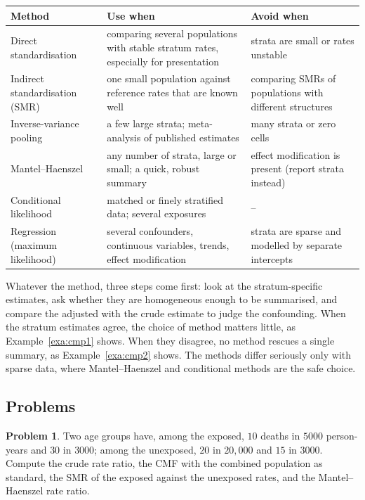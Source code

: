 \documentclass[11pt,a4paper]{article}
\numberwithin{equation}{section}
\theoremstyle{definition}
\newtheorem{problemx}{Problem}[subsection]
\newenvironment{problem}{\begin{problemx}}{\end{problemx}}
\begin{document}
\begin{center}
\begin{tabular}{p{3.6cm}p{5.4cm}p{5.4cm}}
\hline
Method & Use when & Avoid when \\
\hline
Direct standardisation & comparing several populations with stable stratum rates, especially for presentation & strata are small or rates unstable \\
Indirect standardisation (SMR) & one small population against reference rates that are known well & comparing SMRs of populations with different structures \\
Inverse-variance pooling & a few large strata; meta-analysis of published estimates & many strata or zero cells \\
Mantel--Haenszel & any number of strata, large or small; a quick, robust summary & effect modification is present (report strata instead) \\
Conditional likelihood & matched or finely stratified data; several exposures & -- \\
Regression (maximum likelihood) & several confounders, continuous variables, trends, effect modification & strata are sparse and modelled by separate intercepts \\
\hline
\end{tabular}
\end{center}

Whatever the method, three steps come first: look at the stratum-specific estimates, ask whether they are homogeneous enough to be
summarised, and compare the adjusted with the crude estimate to judge the confounding. When the stratum estimates agree, the choice of
method matters little, as Example~\ref{exa:cmp1} shows. When they disagree, no method rescues a single summary, as Example~\ref{exa:cmp2}
shows. The methods differ seriously only with sparse data, where Mantel--Haenszel and conditional methods are the safe choice.

\subsection{Problems}

\begin{problem}
Two age groups have, among the exposed, $10$ deaths in $5000$ person-years and $30$ in $3000$; among the unexposed, $20$ in $20{,}000$ and $15$ in $3000$.
Compute the crude rate ratio, the CMF with the combined population as standard, the SMR of the exposed against the unexposed rates, and the
Mantel--Haenszel rate ratio.
\end{problem}
\end{document}
